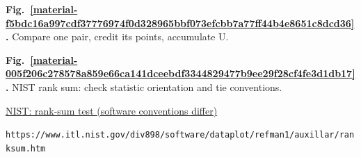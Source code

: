 \documentclass[11pt,a4paper]{article}
\begin{document}
\par\medskip
\Needspace{10cm}
\label{material-f5bdc16a997cdf37776974f0d328965bbf073efcbb7a77ff44b4e8651c8dcd36}
\noindent\textbf{Fig.~\ref*{material-f5bdc16a997cdf37776974f0d328965bbf073efcbb7a77ff44b4e8651c8dcd36}.} Compare one pair, credit its points, accumulate U.\par\nopagebreak
\begin{center}
\end{center}


\medskip

\par\medskip
\Needspace{10cm}
\label{material-005f206c278578a859e66ca141dceebdf3344829477b9ee29f28cf4fe3d1db17}
\noindent\textbf{Fig.~\ref*{material-005f206c278578a859e66ca141dceebdf3344829477b9ee29f28cf4fe3d1db17}.} NIST rank sum: check statistic orientation and tie conventions.\par\nopagebreak
\noindent\href{https://www.itl.nist.gov/div898/software/dataplot/refman1/auxillar/ranksum.htm}{NIST: rank-sum test (software conventions differ)}\par
\nolinkurl{https://www.itl.nist.gov/div898/software/dataplot/refman1/auxillar/ranksum.htm}\par
\end{document}

